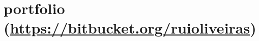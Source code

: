\documentclass[]{friggeri-cv} %
\begin{document}


\section{portfolio {\normalfont \normalsize (\href{https://bitbucket.org/ruioliveiras}{https://bitbucket.org/ruioliveiras})}}
\end{document}
